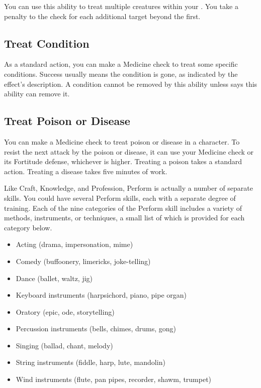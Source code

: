         You can use this ability to treat multiple creatures within your .
        You take a  penalty to the check for each additional target beyond the first.

    \subsection{Treat Condition}\label{Treat Condition}
        As a standard action, you can make a Medicine check to treat some specific conditions.
        Success usually means the condition is gone, as indicated by the effect's description.
        A condition cannot be removed by this ability unless says this ability can remove it.

    \subsection{Treat Poison or Disease}
        You can make a Medicine check to treat poison or disease in a character.
        To resist the next attack by the poison or disease, it can use your Medicine check or its Fortitude defense, whichever is higher.
        Treating a poison takes a standard action. Treating a disease takes five minutes of work.

\newpage
{}
        \par Like Craft, Knowledge, and Profession, Perform is actually a number of separate skills.
        You could have several Perform skills, each with a separate degree of training.
        Each of the nine categories of the Perform skill includes a variety of methods, instruments, or techniques, a small list of which is provided for each category below.

        \begin{itemize}
            \item Acting (drama, impersonation, mime)
            \item Comedy (buffoonery, limericks, joke-telling)
            \item Dance (ballet, waltz, jig)
            \item Keyboard instruments (harpsichord, piano, pipe organ)
            \item Oratory (epic, ode, storytelling)
            \item Percussion instruments (bells, chimes, drums, gong)
            \item Singing (ballad, chant, melody)
            \item String instruments (fiddle, harp, lute, mandolin)
            \item Wind instruments (flute, pan pipes, recorder, shawm, trumpet)
        \end{itemize}

